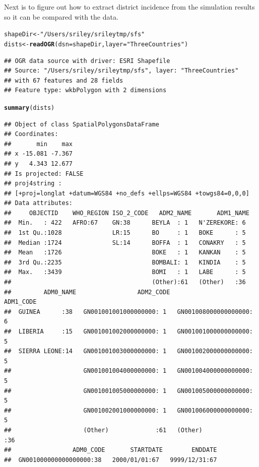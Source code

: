 \documentclass{article}\usepackage{graphicx, color}
\makeatletter
\newcommand{\hlfunctioncall}[1]{\textcolor[rgb]{0.501960784313725,0,0.329411764705882}{\textbf{#1}}}%
\newcommand{\hlstring}[1]{\textcolor[rgb]{0.6,0.6,1}{#1}}%
\newenvironment{kframe}{%
 \def\at@end@of@kframe{}%
 \ifinner\ifhmode%
  \def\at@end@of@kframe{\end{minipage}}%
  \begin{minipage}{\columnwidth}%
 \fi\fi%
 \def\FrameCommand##1{\hskip\@totalleftmargin \hskip-\fboxsep
 \colorbox{shadecolor}{##1}\hskip-\fboxsep
     \hskip-\linewidth \hskip-\@totalleftmargin \hskip\columnwidth}%
 \MakeFramed {\advance\hsize-\width
   \@totalleftmargin\z@ \linewidth\hsize
   \@setminipage}}%
 {\par\unskip\endMakeFramed%
 \at@end@of@kframe}
\newenvironment{knitrout}{}{} %
\makeatother
\begin{document}
Next is to figure out how to extract district incidence from the simulation
results so it can be compared with the data.

\begin{knitrout}
\color{fgcolor}\begin{kframe}
\begin{alltt}
shapeDir <- \hlstring{"/Users/sriley/srileytmp/sfs"}
dists <- \hlfunctioncall{readOGR}(dsn=shapeDir,layer=\hlstring{"ThreeCountries"})
\end{alltt}
\begin{verbatim}
## OGR data source with driver: ESRI Shapefile 
## Source: "/Users/sriley/srileytmp/sfs", layer: "ThreeCountries"
## with 67 features and 28 fields
## Feature type: wkbPolygon with 2 dimensions
\end{verbatim}
\begin{alltt}
\hlfunctioncall{summary}(dists)
\end{alltt}
\begin{verbatim}
## Object of class SpatialPolygonsDataFrame
## Coordinates:
##       min    max
## x -15.081 -7.367
## y   4.343 12.677
## Is projected: FALSE 
## proj4string :
## [+proj=longlat +datum=WGS84 +no_defs +ellps=WGS84 +towgs84=0,0,0]
## Data attributes:
##     OBJECTID    WHO_REGION ISO_2_CODE   ADM2_NAME       ADM1_NAME 
##  Min.   : 422   AFRO:67    GN:38      BEYLA  : 1   N'ZEREKORE: 6  
##  1st Qu.:1028              LR:15      BO     : 1   BOKE      : 5  
##  Median :1724              SL:14      BOFFA  : 1   CONAKRY   : 5  
##  Mean   :1726                         BOKE   : 1   KANKAN    : 5  
##  3rd Qu.:2235                         BOMBALI: 1   KINDIA    : 5  
##  Max.   :3439                         BOMI   : 1   LABE      : 5  
##                                       (Other):61   (Other)   :36  
##         ADM0_NAME                 ADM2_CODE                 ADM1_CODE 
##  GUINEA      :38   GN001001001000000000: 1   GN001008000000000000: 6  
##  LIBERIA     :15   GN001001002000000000: 1   GN001001000000000000: 5  
##  SIERRA LEONE:14   GN001001003000000000: 1   GN001002000000000000: 5  
##                    GN001001004000000000: 1   GN001004000000000000: 5  
##                    GN001001005000000000: 1   GN001005000000000000: 5  
##                    GN001002001000000000: 1   GN001006000000000000: 5  
##                    (Other)             :61   (Other)             :36  
##                 ADM0_CODE       STARTDATE        ENDDATE  
##  GN001000000000000000:38   2000/01/01:67   9999/12/31:67  

\end{verbatim}
\end{kframe}
\end{knitrout}
\end{document}
